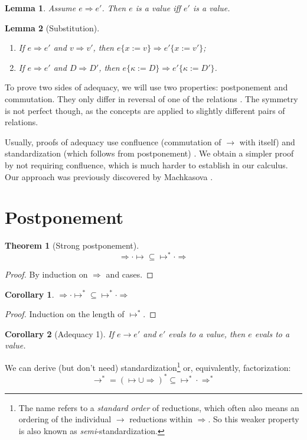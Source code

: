 \documentclass[a4paper, 11pt,titlepage, openright, twoside]{report}
\newcommand{\Int}{\Rightarrow}
\newcommand{\subst}[2]{\{#1{:=}#2\}}
\newcommand{\+}{\enspace}
\newtheorem{corollary}{Corollary}
\newtheorem{lemma}{Lemma}
\newtheorem{theorem}{Theorem}
\begin{document}
\begin{lemma} Assume $e \Int e'$. Then $e$ is a value iff $e'$ is a value.
\end{lemma}

\begin{lemma}[Substitution]
	\item
	\begin{enumerate}
		\item If $e \Int e'$ and $v \Int v'$, then $e\subst{x}{v} \Int e'\subst{x}{v'}$;
		\item If $e \Int e'$ and $D \Int D'$, then $e\subst{κ}{D} \Int e'\subst{κ}{D'}$.
	\end{enumerate}
\end{lemma}

To prove two sides of adequacy, we will use two properties: postponement and commutation.
They only differ in reversal of one of the relations \cite{factorize}.
The symmetry is not perfect though, as the concepts are applied to slightly different pairs of relations.

Usually, proofs of adequacy use confluence (commutation of $→$ with itself) and standardization (which follows from postponement) \cite{Plotkin75, crary2009}.
We obtain a simpler proof by not requiring confluence, which is much harder to establish in our calculus.
Our approach was previously discovered by Machkasova \cite{machka}.

\section{Postponement}

\begin{theorem}[Strong postponement]
	$${\Int · ↦} ⊆ {↦^* · \Int}$$
\end{theorem}
\begin{proof}
	By induction on $\Int$ and cases.
\end{proof}
\begin{corollary}
	${\Int · ↦^*} ⊆ {↦^* · \Int}$
\end{corollary}
\begin{proof}
	Induction on the length of $↦^*$.
\end{proof}
\begin{corollary}[Adequacy 1]
	If $e → e'$ and $e'$ evals to a value, then $e$ evals to a value.
\end{corollary}

We can derive (but don't need) standardization\footnote{
	The name refers to a \textit{standard order} of reductions,
	which often also means an ordering of the individual $→$ reductions within $\Int$.
	So this weaker property is also known as \textit{semi}-standardization.
} or, equivalently, factorization\cite{factorize}:
$$→^* = (↦ ∪ \Int)^* ⊆ {↦^* · \Int^*}$$
\end{document}
